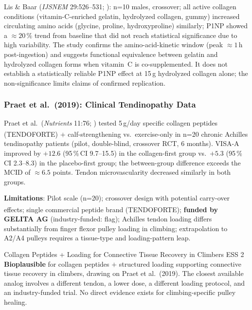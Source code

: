 Lis \& Baar (\textit{IJSNEM} 29:526--531; \cite{LB19}): n=10 males, crossover; all active collagen conditions (vitamin-C-enriched gelatin, hydrolyzed collagen, gummy) increased circulating amino acids (glycine, proline, hydroxyproline) similarly; P1NP showed a ${\approx}20\,\%$ trend from baseline that did not reach statistical significance due to high variability. The study confirms the amino-acid-kinetic window (peak ${\approx}1$\,h post-ingestion) and suggests functional equivalence between gelatin and hydrolyzed collagen forms when vitamin~C is co-supplemented. It does not establish a statistically reliable P1NP effect at 15\,g hydrolyzed collagen alone; the non-significance limits claims of confirmed replication.

\subsubsection{Praet et al.\ (2019): Clinical Tendinopathy Data}

Praet et al.\ (\textit{Nutrients} 11:76; \cite{PPW+19}) tested 5\,g/day specific collagen peptides (TENDOFORTE\textsuperscript{\textregistered}) $+$ calf-strengthening vs.\ exercise-only in n=20 chronic Achilles tendinopathy patients (pilot, double-blind, crossover RCT, 6 months). VISA-A improved by $+12.6$ (95\,\%\,CI 9.7--15.5) in the collagen-first group vs.\ $+5.3$ (95\,\%\,CI 2.3--8.3) in the placebo-first group; the between-group difference exceeds the MCID of ${\approx}6.5$ points. Tendon microvascularity decreased similarly in both groups.

\textbf{Limitations}: Pilot scale (n=20); crossover design with potential carry-over effects; single commercial peptide brand (TENDOFORTE\textsuperscript{\textregistered}); \textbf{funded by GELITA AG} (industry-funded: flag); Achilles tendon loading differs substantially from finger flexor pulley loading in climbing; extrapolation to A2/A4 pulleys requires a tissue-type and loading-pattern leap.

\begin{bioplausbox}{Collagen Peptides + Loading for Connective Tissue Recovery in Climbers \cdot \bioplausible \cdot ESS 2}
\textbf{Bioplausible} for collagen peptides $+$ structured loading supporting connective tissue recovery in climbers, drawing on Praet et al.\ (2019). The closest available analog involves a different tendon, a lower dose, a different loading protocol, and an industry-funded trial. No direct evidence exists for climbing-specific pulley healing.
\end{bioplausbox}

